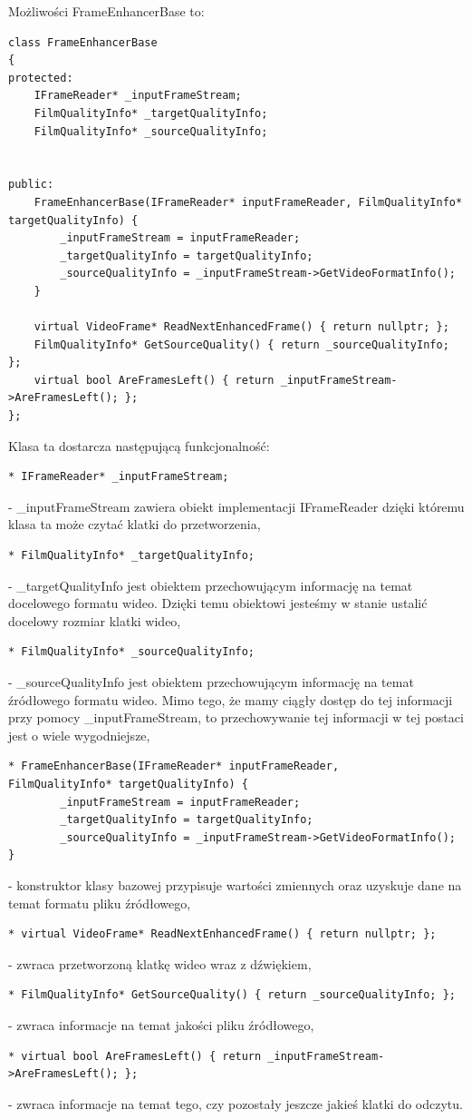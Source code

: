 \documentclass[twoside]{projektInzynierskiMS}
\begin{document}
Możliwości FrameEnhancerBase to: 

\begin{verbatim}
class FrameEnhancerBase
{
protected:
	IFrameReader* _inputFrameStream;
	FilmQualityInfo* _targetQualityInfo;
	FilmQualityInfo* _sourceQualityInfo;


public:
	FrameEnhancerBase(IFrameReader* inputFrameReader, FilmQualityInfo* targetQualityInfo) {
		_inputFrameStream = inputFrameReader;
		_targetQualityInfo = targetQualityInfo;
		_sourceQualityInfo = _inputFrameStream->GetVideoFormatInfo();
	}

	virtual VideoFrame* ReadNextEnhancedFrame() { return nullptr; };
	FilmQualityInfo* GetSourceQuality() { return _sourceQualityInfo; };
	virtual bool AreFramesLeft() { return _inputFrameStream->AreFramesLeft(); };
};
\end{verbatim}

Klasa ta dostarcza następującą funkcjonalność:

\begin{verbatim}
* IFrameReader* _inputFrameStream;
\end{verbatim}
- \_inputFrameStream zawiera obiekt implementacji IFrameReader dzięki któremu klasa ta może czytać klatki do przetworzenia,
\begin{verbatim}
* FilmQualityInfo* _targetQualityInfo;
\end{verbatim}
 - \_targetQualityInfo jest obiektem przechowującym informację na temat docelowego formatu wideo. Dzięki temu obiektowi jesteśmy w stanie ustalić docelowy rozmiar klatki wideo,
\begin{verbatim}
* FilmQualityInfo* _sourceQualityInfo;
\end{verbatim}
- \_sourceQualityInfo jest obiektem przechowującym informację na temat źródłowego formatu wideo. Mimo tego, że mamy ciągły dostęp do tej informacji przy pomocy \_inputFrameStream, to przechowywanie tej informacji w tej postaci jest o wiele wygodniejsze,
\begin{verbatim}
* FrameEnhancerBase(IFrameReader* inputFrameReader, 
FilmQualityInfo* targetQualityInfo) {
        _inputFrameStream = inputFrameReader;
        _targetQualityInfo = targetQualityInfo;
        _sourceQualityInfo = _inputFrameStream->GetVideoFormatInfo();
}
\end{verbatim}
- konstruktor klasy bazowej przypisuje wartości zmiennych oraz uzyskuje dane na temat formatu pliku źródłowego,
\begin{verbatim}
* virtual VideoFrame* ReadNextEnhancedFrame() { return nullptr; };
\end{verbatim}
- zwraca przetworzoną klatkę wideo wraz z dźwiękiem,
\begin{verbatim}
* FilmQualityInfo* GetSourceQuality() { return _sourceQualityInfo; };
\end{verbatim}
- zwraca informacje na temat jakości pliku źródłowego,
\begin{verbatim}
* virtual bool AreFramesLeft() { return _inputFrameStream->AreFramesLeft(); };
\end{verbatim}
- zwraca informacje na temat tego, czy pozostały jeszcze jakieś klatki do odczytu.
\end{document}
